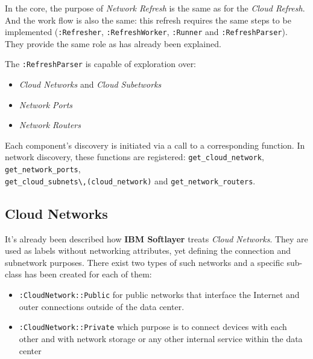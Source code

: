 In the core, the purpose of \emph{Network Refresh} is the same as for the \emph{Cloud Refresh}. And the work flow is also the same: this refresh requires the same steps to be implemented (\verb|:Refresher|, \verb|:RefreshWorker|, \verb|:Runner| and \verb|:RefreshParser|). They provide the same role as has already been explained.

The \verb|:RefreshParser| is capable of exploration over:

\begin{itemize}
	\item \emph{Cloud Networks} and \emph{Cloud Subetworks}
	\item \emph{Network Ports}
	\item \emph{Network Routers}
\end{itemize}

Each component's discovery is initiated via a call to a corresponding function. In network discovery, these functions are registered: \verb|get_cloud_network|, \verb|get_network_ports|, \\ \verb|get_cloud_subnets\,(cloud_network)| and \verb|get_network_routers|.

\subsection{Cloud Networks}
\label{sub:Cloud Networks}

It's already been described how \textbf{IBM Softlayer} treats \emph{Cloud Networks}. They are used as labels without networking attributes, yet defining the connection and subnetwork purposes. There exist two types of such networks and a specific sub-class has been created for each of them:

\begin{itemize}
	\item \verb|:CloudNetwork::Public| for public networks that interface the Internet and outer connections outside of the data center.
	\item \verb|:CloudNetwork::Private| which purpose is to connect devices with each other and with network storage or any other internal service within the data center
\end{itemize}

